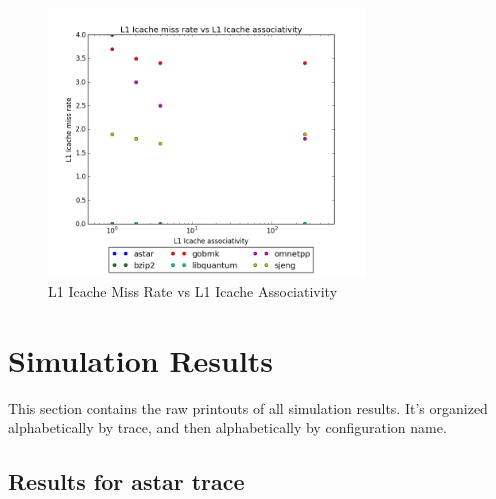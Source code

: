 \documentclass{article}
\begin{document}
\begin{figure}[ht]
    \centering
    \includegraphics[width=0.75\textwidth]{plots/L1icache_miss_vs_L1icache_Assoc.png}
    \caption{L1 Icache Miss Rate vs L1 Icache Associativity}
    \label{fig:L1imissvsl1iassoc}
\end{figure}




\clearpage
\appendix
\section{Simulation Results}

This section contains the raw printouts of all simulation results. It's
organized alphabetically by trace, and then alphabetically by configuration
name.

\clearpage
\subsection{Results for astar trace}


\clearpage


\clearpage


\clearpage
\end{document}
